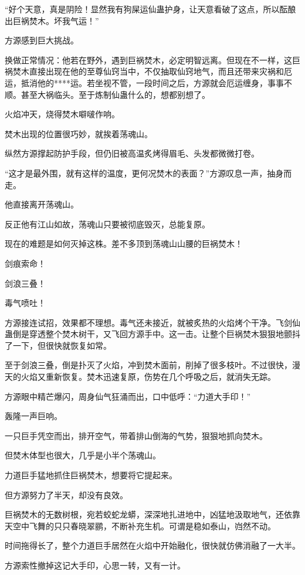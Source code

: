 \begin{this_body}
“好个天意，真是阴险！显然我有狗屎运仙蛊护身，让天意看破了这点，所以酝酿出巨祸焚木。坏我气运！”

方源感到巨大挑战。

换做正常情况：他若在野外，遇到巨祸焚木，必定明智远离。但现在不一样，这巨祸焚木直接出现在他的至尊仙窍当中，不仅抽取仙窍地气，而且还带来灾祸和厄运，抵消他的****运。若坐视不管，一段时间之后，方源就会厄运缠身，事事不顺。甚至大祸临头。至于炼制仙蛊什么的，想都别想了。

火焰冲天，烧得焚木噼啵作响。

焚木出现的位置很巧妙，就挨着荡魂山。

纵然方源撑起防护手段，但仍旧被高温炙烤得眉毛、头发都微微打卷。

“这才是最外围，就有这样的温度，更何况焚木的表面？”方源叹息一声，抽身而走。

他直接离开荡魂山。

反正他有江山如故，荡魂山只要被彻底毁灭，总能复原。

现在的难题是如何灭掉这株。差不多顶到荡魂山山腰的巨祸焚木！

剑痕索命！

剑浪三叠！

毒气喷吐！

方源接连试招，效果都不理想。毒气还未接近，就被炙热的火焰烤个干净。飞剑仙蛊倒是穿透整个焚木树干，又飞回方源手中。这一击。让整个巨祸焚木狠狠地颤抖了一下，但很快就恢复如常。

至于剑浪三叠，倒是扑灭了火焰，冲到焚木面前，削掉了很多枝叶。不过很快，漫天的火焰又重新恢复。焚木迅速复原，伤势在几个呼吸之后，就消失无踪。

方源眼中精芒爆闪，周身仙气狂涌而出，口中低呼：“力道大手印！”

轰隆一声巨响。

一只巨手凭空而出，排开空气，带着排山倒海的气势，狠狠地抓向焚木。

但焚木体型也很大，几乎是小半个荡魂山。

力道巨手猛地抓住巨祸焚木，想要将它提起来。

但方源努力了半天，却没有良效。

巨祸焚木的无数树根，宛若蛟蛇龙蟒，深深地扎进地中，凶猛地汲取地气，还依靠天空中飞舞的只只春晓翠鹂，不断补充生机。可谓是稳如泰山，岿然不动。

时间拖得长了，整个力道巨手居然在火焰中开始融化，很快就仿佛消融了一大半。

方源索性撤掉这记大手印，心思一转，又有一计。


\end{this_body}
